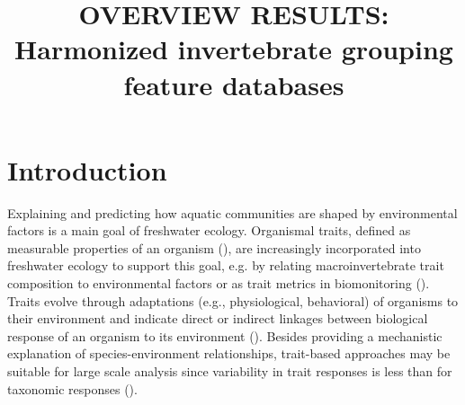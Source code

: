 \documentclass{article}
\title{OVERVIEW RESULTS: Harmonized invertebrate grouping feature databases}
\author{}%
\date{}
\begin{document}
\maketitle

\section*{Introduction}

Explaining and predicting how aquatic communities are shaped by environmental factors is a main goal of freshwater ecology. Organismal traits, defined as measurable properties of an organism (\cite{mcgill_rebuilding_2006}), are increasingly incorporated into freshwater ecology to support this goal, e.g. by relating macroinvertebrate trait composition to environmental factors or as trait metrics in biomonitoring (\cite{poff_developing_2010, szocs_effects_2014, bhowmik_large_2015, menezes_beyond_2010}). Traits evolve through adaptations (e.g., physiological, behavioral) of organisms to their environment and indicate direct or indirect linkages between biological response of an organism to its environment (\cite{southwood_habitat_1977, verberk_delivering_2013}). %
Besides providing a mechanistic explanation of species-environment relationships, trait-based approaches may be suitable for large scale analysis since variability in trait responses is less than for taxonomic responses (\cite{bonada_taxonomic_2007}).
\end{document}
